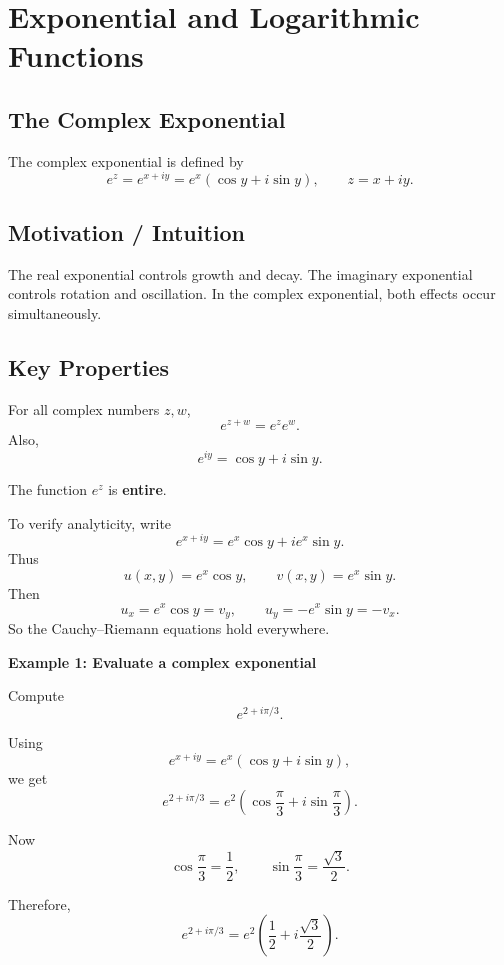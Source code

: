 \section{Exponential and Logarithmic Functions}

\subsection{The Complex Exponential}

\begin{conceptbox}
    The complex exponential is defined by
    \[
        e^z = e^{x+iy}=e^x(\cos y+i\sin y),
        \qquad z=x+iy.
    \]
\end{conceptbox}

\subsection*{Motivation / Intuition}

The real exponential controls growth and decay. The imaginary exponential controls rotation and oscillation. In the complex exponential, both effects occur simultaneously.

\subsection*{Key Properties}

\begin{conceptbox}
    For all complex numbers $z,w$,
    \[
        e^{z+w}=e^ze^w.
    \]
    Also,
    \[
        e^{iy}=\cos y+i\sin y.
    \]
\end{conceptbox}

\begin{conceptbox}
    The function $e^z$ is \textbf{entire}.
\end{conceptbox}

To verify analyticity, write
\[
    e^{x+iy}=e^x\cos y+i e^x\sin y.
\]
Thus
\[
    u(x,y)=e^x\cos y,
    \qquad
    v(x,y)=e^x\sin y.
\]
Then
\[
    u_x=e^x\cos y=v_y,
    \qquad
    u_y=-e^x\sin y=-v_x.
\]
So the Cauchy--Riemann equations hold everywhere.

\begin{examplebox}
    \textbf{Example 1: Evaluate a complex exponential}

    Compute
    \[
        e^{2+i\pi/3}.
    \]

    Using
    \[
        e^{x+iy}=e^x(\cos y+i\sin y),
    \]
    we get
    \[
        e^{2+i\pi/3}
        =
        e^2\left(\cos\frac{\pi}{3}+i\sin\frac{\pi}{3}\right).
    \]

    Now
    \[
        \cos\frac{\pi}{3}=\frac12,
        \qquad
        \sin\frac{\pi}{3}=\frac{\sqrt{3}}{2}.
    \]

    Therefore,
    \[
        e^{2+i\pi/3}
        =
        e^2\left(\frac12+i\frac{\sqrt{3}}{2}\right).
    \]
\end{examplebox}

